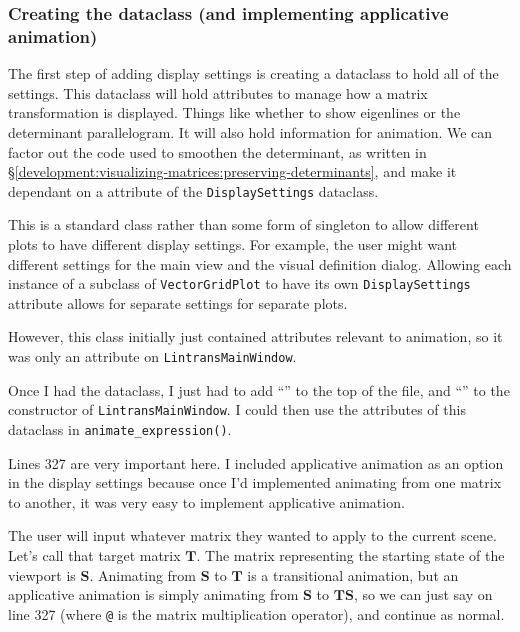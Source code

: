 \documentclass[../development.tex]{subfiles}
\begin{document}
\subsubsection{Creating the dataclass (and implementing applicative animation)\label{development:adding-display-settings:creating-the-dataclass-(and-implementing-applicative-animation)}}

The first step of adding display settings is creating a dataclass to hold all of the settings. This dataclass will hold attributes to manage how a matrix transformation is displayed. Things like whether to show eigenlines or the determinant parallelogram. It will also hold information for animation. We can factor out the code used to smoothen the determinant, as written in \S\ref{development:visualizing-matrices:preserving-determinants}, and make it dependant on a  attribute of the \texttt{DisplaySettings} dataclass.

This is a standard class rather than some form of singleton to allow different plots to have different display settings. For example, the user might want different settings for the main view and the visual definition dialog. Allowing each instance of a subclass of \texttt{VectorGridPlot} to have its own \texttt{DisplaySettings} attribute allows for separate settings for separate plots.

However, this class initially just contained attributes relevant to animation, so it was only an attribute on \texttt{LintransMainWindow}.


Once I had the dataclass, I just had to add \enquote{} to the top of the file, and \enquote{} to the constructor of \texttt{LintransMainWindow}. I could then use the attributes of this dataclass in \texttt{animate\_expression()}.


Lines 327 are very important here. I included applicative animation as an option in the display settings because once I'd implemented animating from one matrix to another, it was very easy to implement applicative animation.

The user will input whatever matrix they wanted to apply to the current scene. Let's call that target matrix $\mathbf{T}$. The matrix representing the starting state of the viewport is $\mathbf{S}$. Animating from $\mathbf{S}$ to $\mathbf{T}$ is a transitional animation, but an applicative animation is simply animating from $\mathbf{S}$ to $\mathbf{T}\mathbf{S}$, so we can just say  on line 327 (where \texttt{@} is the matrix multiplication operator), and continue as normal.
\end{document}
